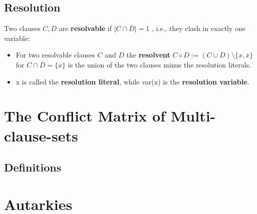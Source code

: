 \documentclass[12pt]{book}
\begin{document}
\section{Resolution}
\label{sec:Resolution}

\begin{defi}\label{def:Resolution}
 Two clauses $C,D$ are \textbf{resolvable} if $\mid C \cap \overline D \mid = 1$ , i.e., they clash in exactly one variable:
\begin{itemize}
 \item For two resolvable clauses $C$ and $D$ the \textbf{resolvent} $C \diamond D := (C \cup D) \setminus \{x, \overline x\} $ for $C \cap \overline D = \{ x \}$ 
 is the union of the two clauses minus the resolution literals.
 \item x is called the \textbf{resolution literal}, while var(x) is the \textbf{resolution variable}.
 \end{itemize}
 \end{defi}

\chapter{The Conflict Matrix of Multi-clause-sets}
\label{cha:The Conflict Matrix of Multi-clause-sets}
\section{Definitions}
\label{sec:Definitions}

\chapter{Autarkies}
\label{cha:Autarkies}
\end{document}
